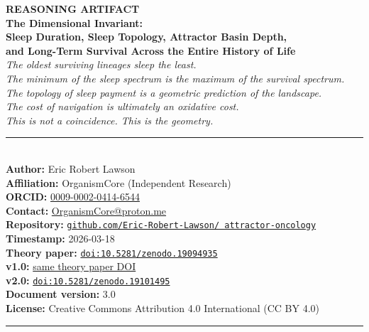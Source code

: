 \documentclass[10pt, a4paper]{article}
\begin{document}
\begin{center}
  {\LARGE\bfseries\color{headergreen}
  REASONING ARTIFACT}\\[0.4em]
  {\Large\bfseries
  The Dimensional Invariant:}\\[0.3em]
  {\Large\bfseries
  Sleep Duration, Sleep Topology,
  Attractor Basin Depth,\\
  and Long-Term Survival
  Across the Entire History of Life}\\[0.5em]
  {\normalsize\itshape
  The oldest surviving lineages sleep
  the least.\\
  The minimum of the sleep spectrum is
  the maximum of the survival spectrum.\\
  The topology of sleep payment is a
  geometric prediction of the landscape.\\
  The cost of navigation is ultimately
  an oxidative cost.\\
  This is not a coincidence.
  This is the geometry.}\\[0.6em]
  \noindent\textcolor{rulecolor}
  {\rule{\linewidth}{1pt}}\\[0.4em]
  {\normalsize
  \textbf{Author:} Eric Robert Lawson\\
  \textbf{Affiliation:} OrganismCore
  (Independent Research)\\
  \textbf{ORCID:}
  \href{https://orcid.org/0009-0002-0414-6544}
  {0009-0002-0414-6544}\\
  \textbf{Contact:}
  \href{mailto:OrganismCore@proton.me}
  {OrganismCore@proton.me}\\
  \textbf{Repository:}
  \href{https://github.com/Eric-Robert-Lawson/
  attractor-oncology}
  {\texttt{github.com/Eric-Robert-Lawson/
  attractor-oncology}}\\
  \textbf{Timestamp:} 2026-03-18\\
  \textbf{Theory paper:}
  \href{https://doi.org/10.5281/zenodo.19094935}
  {\texttt{doi:10.5281/zenodo.19094935}}\\
  \textbf{v1.0:}
  \href{https://doi.org/10.5281/zenodo.19094935}
  {same theory paper DOI}\\
  \textbf{v2.0:}
  \href{https://doi.org/10.5281/zenodo.19101495}
  {\texttt{doi:10.5281/zenodo.19101495}}\\
  \textbf{Document version:} 3.0\\
  \textbf{License:}
  Creative Commons Attribution 4.0
  International (CC BY 4.0)}\\[0.4em]
  \noindent\textcolor{rulecolor}
  {\rule{\linewidth}{1pt}}
\end{center}
\end{document}
